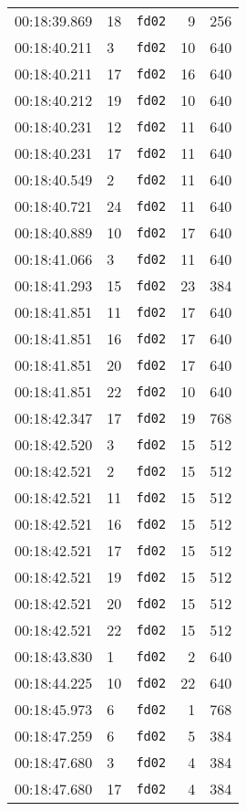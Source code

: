 \documentclass{article}
\begin{document}
\begin{longtable}{lllrr}
00:18:39.869 & 18 & \texttt{fd02} & 9 & 256 \\
00:18:40.211 & 3 & \texttt{fd02} & 10 & 640 \\
00:18:40.211 & 17 & \texttt{fd02} & 16 & 640 \\
00:18:40.212 & 19 & \texttt{fd02} & 10 & 640 \\
00:18:40.231 & 12 & \texttt{fd02} & 11 & 640 \\
00:18:40.231 & 17 & \texttt{fd02} & 11 & 640 \\
00:18:40.549 & 2 & \texttt{fd02} & 11 & 640 \\
00:18:40.721 & 24 & \texttt{fd02} & 11 & 640 \\
00:18:40.889 & 10 & \texttt{fd02} & 17 & 640 \\
00:18:41.066 & 3 & \texttt{fd02} & 11 & 640 \\
00:18:41.293 & 15 & \texttt{fd02} & 23 & 384 \\
00:18:41.851 & 11 & \texttt{fd02} & 17 & 640 \\
00:18:41.851 & 16 & \texttt{fd02} & 17 & 640 \\
00:18:41.851 & 20 & \texttt{fd02} & 17 & 640 \\
00:18:41.851 & 22 & \texttt{fd02} & 10 & 640 \\
00:18:42.347 & 17 & \texttt{fd02} & 19 & 768 \\
00:18:42.520 & 3 & \texttt{fd02} & 15 & 512 \\
00:18:42.521 & 2 & \texttt{fd02} & 15 & 512 \\
00:18:42.521 & 11 & \texttt{fd02} & 15 & 512 \\
00:18:42.521 & 16 & \texttt{fd02} & 15 & 512 \\
00:18:42.521 & 17 & \texttt{fd02} & 15 & 512 \\
00:18:42.521 & 19 & \texttt{fd02} & 15 & 512 \\
00:18:42.521 & 20 & \texttt{fd02} & 15 & 512 \\
00:18:42.521 & 22 & \texttt{fd02} & 15 & 512 \\
00:18:43.830 & 1 & \texttt{fd02} & 2 & 640 \\
00:18:44.225 & 10 & \texttt{fd02} & 22 & 640 \\
00:18:45.973 & 6 & \texttt{fd02} & 1 & 768 \\
00:18:47.259 & 6 & \texttt{fd02} & 5 & 384 \\
00:18:47.680 & 3 & \texttt{fd02} & 4 & 384 \\
00:18:47.680 & 17 & \texttt{fd02} & 4 & 384 \\

\end{longtable}
\end{document}
